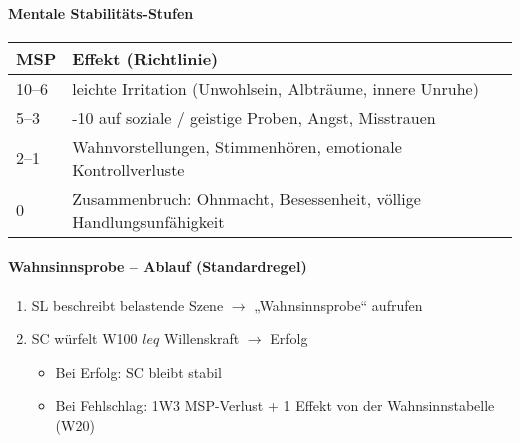 \paragraph{Mentale Stabilitäts-Stufen}
\begin{center}
\begin{tabular}{ll}
\toprule
\textbf{MSP} & \textbf{Effekt (Richtlinie)}\\
\midrule 
10–6 & leichte Irritation (Unwohlsein, Albträume, innere Unruhe)\\
\midrule 
5–3 & -10 auf soziale / geistige Proben, Angst, Misstrauen\\
\midrule 
2–1 & Wahnvorstellungen, Stimmenhören, emotionale Kontrollverluste\\
\midrule 
0 & Zusammenbruch: Ohnmacht, Besessenheit, völlige Handlungsunfähigkeit\\
\bottomrule
\end{tabular} 
\end{center}
\paragraph{Wahnsinnsprobe – Ablauf (Standardregel)}
\begin{enumerate}
\item SL beschreibt belastende Szene $\rightarrow$ „Wahnsinnsprobe“ aufrufen
\item SC würfelt W100 $leq$ Willenskraft $\rightarrow$ Erfolg
\begin{itemize}
\item Bei Erfolg: SC bleibt stabil
\item Bei Fehlschlag: 1W3 MSP-Verlust + 1 Effekt von der Wahnsinnstabelle (W20)
\end{itemize}
\end{enumerate}


